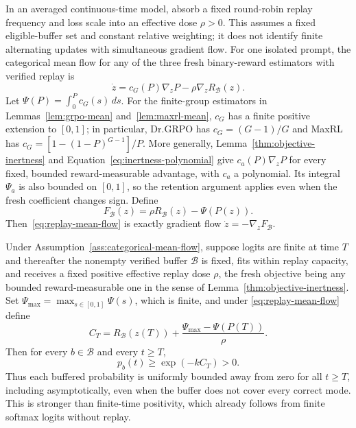 In an averaged continuous-time model, absorb a fixed round-robin replay
frequency and loss scale into an effective dose $\rho>0$. This assumes a
fixed eligible-buffer set and constant relative weighting; it does not identify
finite alternating updates with simultaneous gradient flow. For one
isolated prompt, the categorical mean flow for any of the three fresh
binary-reward estimators with verified replay is
\begin{equation}
  \dot z
  =c_G(P)\nabla_zP-\rho\nabla_zR_{\mathcal B}(z).
  \label{eq:replay-mean-flow}
\end{equation}
Let $\Psi(P)=\int_0^P c_G(s)\,ds$. For the finite-group estimators in Lemmas~\ref{lem:grpo-mean}
and~\ref{lem:maxrl-mean}, $c_G$ has a finite positive extension to $[0,1]$;
in particular, Dr.GRPO has $c_G=(G-1)/G$ and MaxRL has
$c_G=[1-(1-P)^{G-1}]/P$. More generally, Lemma~\ref{thm:objective-inertness} and
Equation~\eqref{eq:inertness-polynomial} give
$c_a(P)\nabla_zP$ for every fixed, bounded reward-measurable advantage,
with $c_a$ a polynomial. Its integral $\Psi_a$ is also bounded on $[0,1]$,
so the retention argument applies even when the fresh coefficient changes
sign. Define
\begin{equation}
  F_{\mathcal B}(z)=\rho R_{\mathcal B}(z)-\Psi(P(z)).
  \label{eq:replay-potential}
\end{equation}
Then~\eqref{eq:replay-mean-flow} is exactly gradient flow
$\dot z=-\nabla_zF_{\mathcal B}$.

\begin{theorem}
\enforcehalffinalproseline
\label{thm:replay-retention}
Under Assumption~\ref{ass:categorical-mean-flow}, suppose logits are finite
at time $T$ and thereafter the nonempty verified buffer $\mathcal B$ is fixed,
fits within replay capacity, and receives a
fixed positive effective replay dose $\rho$, the fresh objective being any
bounded reward-measurable one in the sense of
Lemma~\ref{thm:objective-inertness}. Set
$\Psi_{\max}=\max_{s\in[0,1]}\Psi(s)$, which is finite, and under
\eqref{eq:replay-mean-flow} define
\[
  C_T
  =R_{\mathcal B}(z(T))
   +\frac{\Psi_{\max}-\Psi(P(T))}{\rho}.
\]
Then for every $b\in\mathcal B$ and every $t\ge T$,
\begin{equation}
  p_b(t)\ge \exp(-kC_T)>0.
  \label{eq:replay-retention-bound}
\end{equation}
Thus each buffered probability is uniformly bounded away from zero for all
$t\ge T$, including asymptotically, even when the buffer does not cover every
correct mode. This is stronger than finite-time positivity, which already
follows from finite softmax logits without replay.
\end{theorem}

